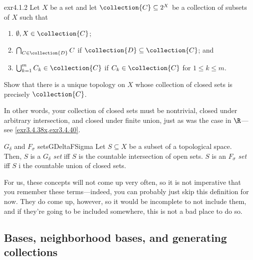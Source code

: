 \begin{exr}{}{exr4.1.2}
Let $X$ be a set and let $\collection{C}\subseteq 2^X$ be a collection of subsets of $X$ such that
\begin{enumerate}
\item $\emptyset ,X\in \collection{C}$;
\item $\bigcap _{C\in \collection{D}}C$ if $\collection{D}\subseteq \collection{C}$; and
\item $\bigcup _{k=1}^mC_k\in \collection{C}$ if $C_k\in \collection{C}$ for $1\leq k\leq m$.
\end{enumerate}
Show that there is a unique topology on $X$ whose collection of closed sets is precisely $\collection{C}$.
\begin{rmk}
In other words, your collection of closed sets must be nontrivial, closed under arbitrary intersection, and closed under finite union, just as was the case in $\R$---see \cref{exr3.4.38x,exr3.4.40}.
\end{rmk}
\end{exr}
\begin{dfn}{$G_\delta$ and $F_\sigma$ sets}{GDeltaFSigma}
Let $S\subseteq X$ be a subset of a topological space.  Then, $S$ is a \emph{$G_\delta$ set} iff $S$ is the countable intersection of open sets.  $S$ is an \emph{$F_\sigma$ set} iff $S$ i the countable union of closed sets.
\begin{rmk}
For us, these concepts will not come up very often, so it is not imperative that you remember these terms---indeed, you can probably just skip this definition for now.  They do come up, however, so it would be incomplete to not include them, and if they're going to be included somewhere, this is not a bad place to do so.
\end{rmk}
\end{dfn}

\subsection{Bases, neighborhood bases, and generating collections}

